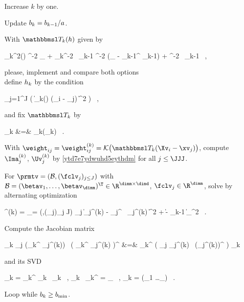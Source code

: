 \begin{mylist}
\item 
Increase \( k \) by one. 

\item
Update \( b_{k} = b_{k-1} / a \).

\item
With \( \TEDR_{k}(\hiso) \) given by
\begin{EQA}[c]
	\TEDR_{k}^{2}(\hiso)
	\eqdef
	\hiso^{-2} \Id_{\dimd} + \haniso_{k}^{-2} \, \JEDR_{k-1}
	\qquad
	\quad
	\hiso^{-2} (\Id_{\dimd} - \PEDR_{k-1}^{\T} \PEDR_{k-1}) + \haniso^{-2} \, \JEDR_{k-1}
	\, ,
\end{EQA}
{\color{blue} please, implement and compare both options}
\\
define \( h_{k} \) by the condition
\begin{EQA}[c]
	 \sum_{j=1}^{J} \sumi 
		\Kern\bigl( \| \TEDR_{k}(\hiso) \; (\Xv_{i} - \xv_{j}) \|^{2} \bigr)
	\geq 
	\nmin
	\, ,
\label{jhgiverkytde4w34etycjam}
\end{EQA}
and fix \( \TEDR_{k} \) by 
\begin{EQA}[rcl]
	\TEDR_{k}
	&=&
	\TEDR_{k}(\hiso_{k})
	\, .
\end{EQA}

\item 
With \( \weight_{ij} = \weight_{ij}^{(k)} = \Kern\bigl( \TEDR_{k} (\Xv_{i} - \xv_{j}) \bigr) \), compute
\( \Ima_{j}^{(k)} \), \( \Uv_{j}^{(k)} \) by \eqref{ytd7e7ydwuhd5eythdm} for all \( j \leq \JJJ \).

\item
For \( \prmtv = (\BEDR,(\fclv_{j})_{j \leq J}) \) with 
\( \BEDR = (\betav_{1}, \ldots, \betav_{\dimm})^{\T} \in \R^{\dimm \times \dimd} \), 
\( \fclv_{j} \in \R^{\dimm} \), solve by alternating optimization
\begin{EQA}[c]
	\prmtv^{(k)}
	=
	\arginf_{\prmtv = (\BEDR,(\fclv_{j})_{j \leq J})}
	\sum_{j} \bigl\| \Ima_{j}^{(k)} - \fclv_{j}^{\T} \BEDR \, \Uv_{j}^{(k)} \bigr\|^{2} 
	+ \lambda \| \BEDR - \PEDR_{k-1} \|_{\Fr}^{2}
	\, .
\end{EQA}


\item
Compute the Jacobian matrix
\begin{EQA}[rcl]
	\JEDR_{k}
	\eqdef
	\sum_{j} (\BEDR_{k}^{\T} {\fclv}_{j}^{(k)}) \, \bigl( \BEDR_{k}^{\T} {\fclv}_{j}^{(k)} \bigr)^{\T}
	&=&
	\BEDR_{k}^{\T} \Bigl( \sum_{j} {\fclv}_{j}^{(k)} \, ({\fclv}_{j}^{(k)})^{\T} \Bigr) \BEDR_{k}
\end{EQA}
and its SVD
\begin{EQA}[c]
	\JEDR_{k}
	=
	\PEDR_{k}^{\T} \Lambda_{k} \, \PEDR_{k}
	\, ,
	\qquad
	\PEDR_{k} \, \PEDR_{k}^{\T}
	= 
	\Id_{\dimm}
	\, ,
	\quad
	\Lambda_{k} = \diag(\lambda_{1} \geq \ldots \geq \lambda_{\dimm})
	\, .
\end{EQA}

\item
Loop while \( b_{k} \geq b_{\min} \).

\end{mylist}
